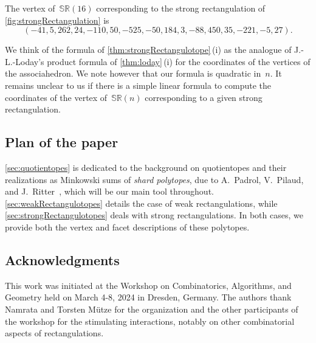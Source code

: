 \documentclass{amsart}
\theoremstyle{definition}
\newtheorem{example}[theorem]{Example}
\renewcommand{\b}[1]{{\boldsymbol{#1}}} %
\newcommand{\darkblue}{\color{darkblue}} %
\newcommand{\defn}[1]{\textsl{\darkblue #1}} %
\newcommand{\vincent}[1]{\todo[size=\normalsize, color=blue!30]{\rm #1 \\ \hfill --- V.}}
\newcommand{\polytope}[1]{\mathds{#1}} %
\newcommand{\SRP}{\polytope{SR}} %
\begin{document}
  The vertex of~$\SRP (16)$ corresponding to the strong rectangulation of \cref{fig:strongRectangulation} is
  \[
  (-41, 5, 262, 24, -110, 50, -525, -50, 184, 3, -88, 450, 35, -221, -5, 27).
  \]

\enlargethispage{.2cm}
We think of the formula of \cref{thm:strongRectangulotope}\,(i) as the analogue of J.-L.-Loday's product formula of \cref{thm:loday}\,(i) for the coordinates of the vertices of the associahedron.
We note however that our formula is quadratic in~$n$.
It remains unclear to us if there is a simple linear formula to compute the coordinates of the vertex of~$\SRP(n)$ corresponding to a given strong rectangulation.


\subsection{Plan of the paper}
\label{subsec:plan}

\cref{sec:quotientopes} is dedicated to the background on quotientopes and their realizations as Minkowski sums of \defn{shard polytopes}, due to A.~Padrol, V.~Pilaud, and J.~Ritter~\cite{MR4584712}, which will be our main tool throughout. \cref{sec:weakRectangulotopes} details the case of weak rectangulations, while \cref{sec:strongRectangulotopes} deals with strong rectangulations. In both cases, we provide both the vertex and facet descriptions of these polytopes.


\subsection*{Acknowledgments}

This work was initiated at the Workshop on Combinatorics, Algorithms, and Geometry held on March 4-8, 2024 in Dresden, Germany.
The authors thank Namrata and Torsten M\"utze for the organization and the other participants of the workshop for the stimulating interactions, notably on other combinatorial aspects of rectangulations.
\end{document}
